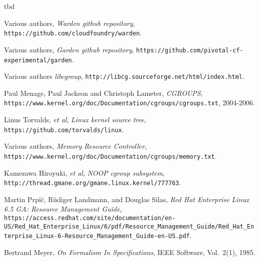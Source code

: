 \documentclass[a4paper,twoside,12pt]{article}
\begin{document}
tbd

\clearpage

\appendix

\begin{flushleft}
\begin{thebibliography}{99}   %


  Various authors,
  \emph{Warden github repository},
  \texttt{https://github.com/cloudfoundry/warden}.

  Various authors,
  \emph{Garden github repository}, 
  \texttt{https://github.com/pivotal-cf-experimental/garden}.

  Various authors
  \emph{libcgroup},
  {\small \texttt{http://libcg.sourceforge.net/html/index.html}}.

  Paul Menage, Paul Jackson and Christoph Lameter,
  \emph{CGROUPS},
  {\small \texttt{https://www.kernel.org/doc/Documentation/cgroups/cgroups.txt}}, 2004-2006.

  Linus Torvalds, \emph{et al},
  \emph{Linux kernel source tree},
  {\small \texttt{https://github.com/torvalds/linux}}.

  Various authors,
  \emph{Memory Resource Controller},
  {\small \texttt{https://www.kernel.org/doc/Documentation/cgroups/memory.txt}}.

  Kamezawa Hiroyuki, \emph{et al},
  \emph{NOOP cgroup subsystem},
  {\small \texttt{http://thread.gmane.org/gmane.linux.kernel/777763}}.

  Martin Prpi\u{c}, R\"udiger Landmann, and Douglas Silas,
  \emph{Red Hat Enterprise Linux 6.5 GA: Resource Management Guide}, 
  {\small \texttt{https://access.redhat.com/site/documentation/en-US\slash{}Red\_Hat\_Enterprise\_Linux/6/pdf/Resource\_Management\_Guide\slash{}Red\_Hat\_Enterprise\_Linux-6-Resource\_Management\_Guide-en-US.pdf}}.

  Bertrand Meyer,
  \emph{On Formalism In Specifications},
  IEEE Software, Vol.~2(1), 1985.
\end{thebibliography}
\end{flushleft}
\end{document}
